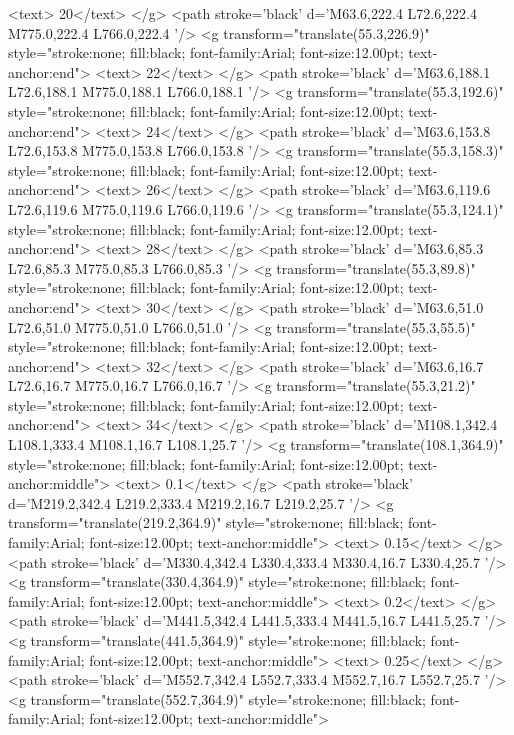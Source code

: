 		<text> 20</text>
	</g>
	<path stroke='black'  d='M63.6,222.4 L72.6,222.4 M775.0,222.4 L766.0,222.4  '/>	<g transform="translate(55.3,226.9)" style="stroke:none; fill:black; font-family:Arial; font-size:12.00pt; text-anchor:end">
		<text> 22</text>
	</g>
	<path stroke='black'  d='M63.6,188.1 L72.6,188.1 M775.0,188.1 L766.0,188.1  '/>	<g transform="translate(55.3,192.6)" style="stroke:none; fill:black; font-family:Arial; font-size:12.00pt; text-anchor:end">
		<text> 24</text>
	</g>
	<path stroke='black'  d='M63.6,153.8 L72.6,153.8 M775.0,153.8 L766.0,153.8  '/>	<g transform="translate(55.3,158.3)" style="stroke:none; fill:black; font-family:Arial; font-size:12.00pt; text-anchor:end">
		<text> 26</text>
	</g>
	<path stroke='black'  d='M63.6,119.6 L72.6,119.6 M775.0,119.6 L766.0,119.6  '/>	<g transform="translate(55.3,124.1)" style="stroke:none; fill:black; font-family:Arial; font-size:12.00pt; text-anchor:end">
		<text> 28</text>
	</g>
	<path stroke='black'  d='M63.6,85.3 L72.6,85.3 M775.0,85.3 L766.0,85.3  '/>	<g transform="translate(55.3,89.8)" style="stroke:none; fill:black; font-family:Arial; font-size:12.00pt; text-anchor:end">
		<text> 30</text>
	</g>
	<path stroke='black'  d='M63.6,51.0 L72.6,51.0 M775.0,51.0 L766.0,51.0  '/>	<g transform="translate(55.3,55.5)" style="stroke:none; fill:black; font-family:Arial; font-size:12.00pt; text-anchor:end">
		<text> 32</text>
	</g>
	<path stroke='black'  d='M63.6,16.7 L72.6,16.7 M775.0,16.7 L766.0,16.7  '/>	<g transform="translate(55.3,21.2)" style="stroke:none; fill:black; font-family:Arial; font-size:12.00pt; text-anchor:end">
		<text> 34</text>
	</g>
	<path stroke='black'  d='M108.1,342.4 L108.1,333.4 M108.1,16.7 L108.1,25.7  '/>	<g transform="translate(108.1,364.9)" style="stroke:none; fill:black; font-family:Arial; font-size:12.00pt; text-anchor:middle">
		<text> 0.1</text>
	</g>
	<path stroke='black'  d='M219.2,342.4 L219.2,333.4 M219.2,16.7 L219.2,25.7  '/>	<g transform="translate(219.2,364.9)" style="stroke:none; fill:black; font-family:Arial; font-size:12.00pt; text-anchor:middle">
		<text> 0.15</text>
	</g>
	<path stroke='black'  d='M330.4,342.4 L330.4,333.4 M330.4,16.7 L330.4,25.7  '/>	<g transform="translate(330.4,364.9)" style="stroke:none; fill:black; font-family:Arial; font-size:12.00pt; text-anchor:middle">
		<text> 0.2</text>
	</g>
	<path stroke='black'  d='M441.5,342.4 L441.5,333.4 M441.5,16.7 L441.5,25.7  '/>	<g transform="translate(441.5,364.9)" style="stroke:none; fill:black; font-family:Arial; font-size:12.00pt; text-anchor:middle">
		<text> 0.25</text>
	</g>
	<path stroke='black'  d='M552.7,342.4 L552.7,333.4 M552.7,16.7 L552.7,25.7  '/>	<g transform="translate(552.7,364.9)" style="stroke:none; fill:black; font-family:Arial; font-size:12.00pt; text-anchor:middle">
